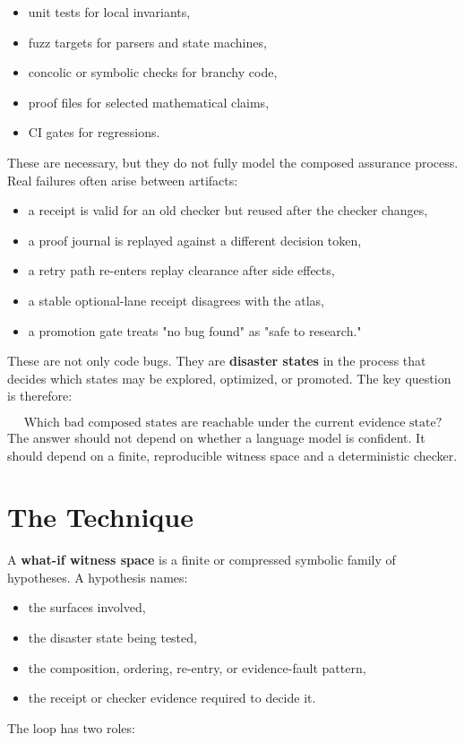 \documentclass[11pt]{article}
\begin{document}
\begin{itemize}
\item unit tests for local invariants,
\item fuzz targets for parsers and state machines,
\item concolic or symbolic checks for branchy code,
\item proof files for selected mathematical claims,
\item CI gates for regressions.
\end{itemize}
These are necessary, but they do not fully model the composed assurance process. Real failures often arise between artifacts:

\begin{itemize}
\item a receipt is valid for an old checker but reused after the checker changes,
\item a proof journal is replayed against a different decision token,
\item a retry path re-enters replay clearance after side effects,
\item a stable optional-lane receipt disagrees with the atlas,
\item a promotion gate treats "no bug found" as "safe to research."
\end{itemize}
These are not only code bugs. They are \textbf{disaster states} in the process that decides which states may be explored, optimized, or promoted. The key question is therefore:

\[
\text{Which bad composed states are reachable under the current evidence state?}
\]
The answer should not depend on whether a language model is confident. It should depend on a finite, reproducible witness space and a deterministic checker.

\section{The Technique}
A \textbf{what-if witness space} is a finite or compressed symbolic family of hypotheses. A hypothesis names:

\begin{itemize}
\item the surfaces involved,
\item the disaster state being tested,
\item the composition, ordering, re-entry, or evidence-fault pattern,
\item the receipt or checker evidence required to decide it.
\end{itemize}
The loop has two roles:
\end{document}
